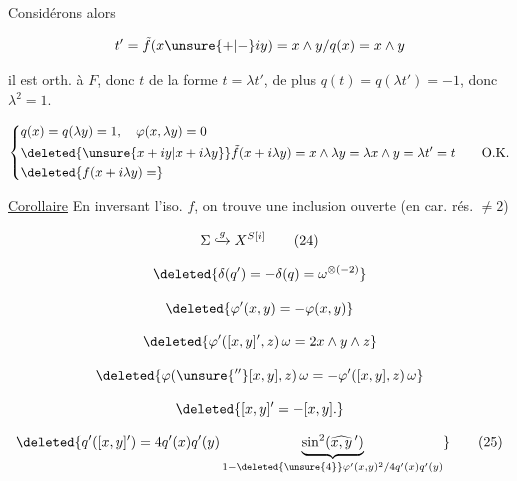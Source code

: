 

Considérons alors

\[
t'=\tilde f(x\unsure{+|-}iy)=x\wedge y/q(x)=x\wedge y
\]

il est orth. à $F$,  donc $t$ de la forme $t=\lambda t'$, de plus $q(t)=q(\lambda t')=-1$, donc $\lambda^2=1$. 


\[
\left\{\begin{aligned} &q(x)=q(\lambda y)=1,\quad\varphi(x,\lambda y)=0\\ &\deleted{\unsure{x+iy|x+i\lambda y}}\tilde f(x+i\lambda y)=x\wedge\lambda y=\lambda x\wedge y=\lambda t'=t \qquad\text{O.K.}\\ &\deleted{f(x+i\lambda y)=}\end{aligned}\right.
\]

\uline{Corollaire} En inversant l'iso. $f$, on trouve une inclusion ouverte (en car. rés. $\ne 2$)

\[
\Sigma\lhook\joinrel\xrightarrow{g}X^{S[i]}\tag*{(24)}
\]


\[
\deleted{\delta(q')=-\delta(q)=\omega^{\otimes(-2)}}
\]


\[
\deleted{\varphi'(x,y)=-\varphi(x,y)}
\]


\[
\deleted{\varphi'([x,y]',z)\,\omega=2x\wedge y\wedge z}
\]


\[
\deleted{\varphi(\unsure{{}^{\prime\prime}}[x,y],z)\,\omega=-\varphi'([x,y],z)\,\omega}
\]

\[
\deleted{[x,y]'=-[x,y].}
\]


\[
\deleted{q'([x,y]')=4q'(x)q'(y)\underbrace{\sin^2(\widehat{x,y}\,')}_{1-\deleted{\unsure{4}}\varphi'(x,y)^2/4q'(x)q'(y)}}\tag*{(25)}
\]

